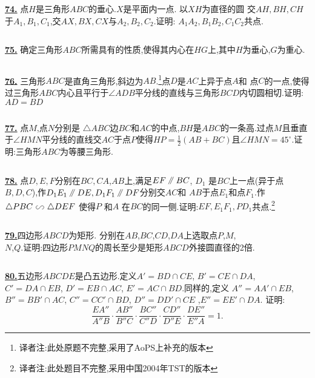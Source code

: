 \documentclass{article}
\newcommand\pxx{%
\mathrel{\text{\tikz[baseline] \draw (0em,-0.3ex) -- (.4em,1.7ex) (.2em,-0.3ex) -- (.6em,1.7ex);}%
}}
\newcommand*\xiangs{%
\mathrel{\text{%
\tikz \draw[baseline] (-.25em,1.15ex) .. controls (-.55em,1.15ex) and (-.51em,.23ex) .. (-.275em,.23ex) .. controls (0,.23ex) and (0,1.15ex) .. (.275em,1.15ex) .. controls (.51em,1.15ex) and (.55em,.23ex) .. (.25em,.23ex);%
}}}
\begin{document}
$$ $$


\href{ http://www.artofproblemsolving.com/Forum/viewtopic.php?p=457871#p457871
}{\bf 74.} 点$H$是三角形$ABC$的垂心.$X$是平面内一点. 以$XH$为直径的圆 交$AH, BH, CH$于$A_1, B_1, C_1$,交$AX, BX, CX$与$A_2, B_2, C_2$.证明: $A_1A_2, B_1B_2, C_1C_2$共点.

$$ $$


\href{ http://www.artofproblemsolving.com/Forum/viewtopic.php?p=279551#p279551
}{\bf 75.} 确定三角形$ABC$所需具有的性质,使得其内心在$HG$上,其中$H$为垂心,$G$为重心.

$$ $$


\href{http://www.artofproblemsolving.com/Forum/viewtopic.php?p=330584#p330584
 }{\bf 76.} 三角形$ABC$是直角三角形,斜边为$AB$.\footnote{译者注:此处原题不完整,采用了AoPS上补充的版本}点$D$是$AC$上异于点$A$和 点$C$的一点,使得过三角形$ABC$内心且平行于$\angle ADB$平分线的直线与三角形$BCD$内切圆相切.证明:$AD=BD$

$$ $$


\href{ http://www.artofproblemsolving.com/Forum/viewtopic.php?p=347135#p347135
}{\bf 77.} 点$M$,点$N$分别是 $\triangle ABC$边$BC$和$AC$的中点,$BH$是$ABC$的一条高.过点$M$且垂直于$\angle HMN$平分线的直线交$AC$于点$P$使得$\displaystyle HP = \frac{1}{2}(AB+BC)$且$\angle HMN = 45^{\circ}$.证明:三角形$ABC$为等腰三角形.


$$ $$

\href{http://www.artofproblemsolving.com/Forum/viewtopic.php?p=347236#p347236
 }{\bf 78.} 点$D,E,F$分别在$BC, CA$,$AB$上,满足$EF \pxx BC$, $D_1$ 是$BC$上一点(异于点$B,D,C$),作$D_1E_1 \pxx DE, D_1F_1 \pxx DF$分别交$AC$和 $AB$于点$E_1$和点$F_1$.作$\triangle PBC \xiangs \triangle DEF$ 使得$P$ 和$A$ 在$BC$的同一侧.证明:$EF, E_1F_1, PD_1$共点.\footnote{译者注:此处题目不完整,采用中国2004年TST的版本}


$$ $$

\href{ http://www.artofproblemsolving.com/Forum/viewtopic.php?p=364939#p364939}{\bf 79.}四边形$ABCD$为矩形. 分别在$AB$,$BC$,$CD$,$DA$上选取点$P$,$M$,\\$N$,$Q$.证明:四边形$PMNQ$的周长至少是矩形$ABCD$外接圆直径的2倍.

$$ $$


\href{ http://www.artofproblemsolving.com/Forum/viewtopic.php?p=363888#p363888
}{\bf 80.}五边形$ABCDE$是凸五边形.定义$A'=BD\cap CE$, $B'=CE\cap DA$, $C'=DA\cap EB$, $D'=EB\cap AC$, $E'=AC\cap BD$.同样的,定义 $A''=AA'\cap EB$, $B''=BB'\cap AC$, $C''=CC'\cap BD$, $D''=DD'\cap CE$ ,$E''=EE'\cap DA$.
证明:
$$ \frac{EA''}{A''B}\cdot\frac{AB''}{B''C}\cdot\frac{BC''}{C''D}\cdot\frac{CD''}{D''E}\cdot\frac{DE''}{E''A}=1.  $$
\end{document}
